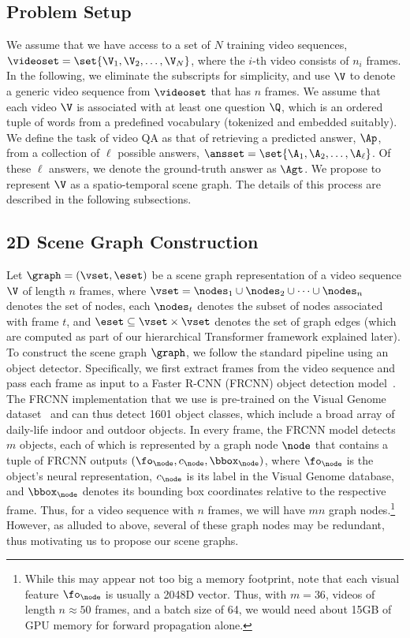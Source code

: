 \documentclass[letterpaper]{article}
\begin{document}
\subsection{Problem Setup}
We assume that we have access to a set of $N$ training video sequences, $\videoset=\set{\V_1, \V_2, \dots, \V_N}$, where the $i$-th video consists of $n_i$ frames. In the following, we eliminate the subscripts for simplicity, and use $\V$ to denote a generic video sequence from $\videoset$ that has $n$ frames. We assume that each video $\V$ is associated with at least one question $\Q$, which is an ordered tuple of words from a predefined vocabulary (tokenized and embedded suitably). We define the task of video QA as that of retrieving a predicted answer, $\Ap$, from a collection of $\ell$ possible answers, $\ansset=\set{\A_1, \A_2, \dots, \A_\ell}$. Of these $\ell$ answers, we denote the ground-truth answer as $\Agt$. We propose to represent $\V$ as a \name spatio-temporal scene graph. The details of this process are described in the following subsections.

\subsection{2D Scene Graph Construction}
Let $\graph=(\vset, \eset)$ be a scene graph representation of a video sequence $\V$ of length $n$ frames, where $\vset = \nodes_1\cup \nodes_2\cup\cdots \cup\nodes_n$ denotes the set of nodes, each $\nodes_t$ denotes the subset of nodes associated with frame $t$, and $\eset\subseteq \vset\times \vset$ denotes the set of graph edges (which are computed as part of our hierarchical Transformer framework explained later). To construct the scene graph $\graph$, we follow the standard pipeline using an object detector. Specifically, we first extract frames from the video sequence and pass each frame as input to a Faster R-CNN (FRCNN) object detection model~\cite{ren2015faster}. The FRCNN implementation that we use is pre-trained on the Visual Genome dataset~\cite{anderson2018bottom} and can thus detect 1601 object classes, which include a broad array of daily-life indoor and outdoor objects. In every frame, the FRCNN model detects $m$ objects, each of which is represented by a graph node $\node$ that contains a tuple of FRCNN outputs $(\fo_\node, c_\node, \bbox_\node)$, where $\fo_\node$ is the object's neural representation, $c_\node$ is its label in the Visual Genome database, and $\bbox_\node$ denotes its bounding box coordinates relative to the respective frame. Thus, for a video sequence with $n$ frames, we will have $mn$ graph nodes.\footnote{While this may appear not too big a memory footprint, note that each visual feature $\fo_\node$ is usually a 2048D vector. Thus, with $m=36$, videos of length $n \approx 50$ frames, and a batch size of 64, we would need about 15GB of GPU memory for forward propagation alone.} However, as alluded to above, several of these graph nodes may be redundant, thus motivating us to propose our \name scene graphs.
\end{document}
